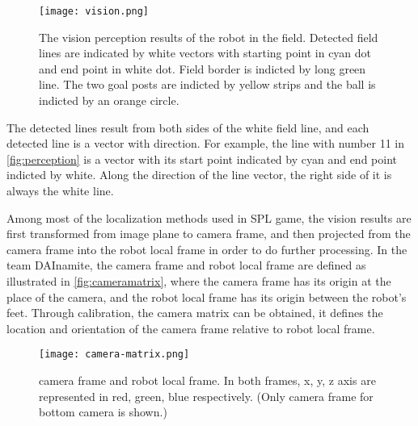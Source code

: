 \begin{figure}[h!]
  \centering
  \texttt{[image: vision.png]}
  \caption[The vision perception result of the robot in the field.]{The vision perception results of the robot in the field. Detected field lines are indicated by white vectors with starting point in cyan dot and end point in white dot. Field border is indicted by long green line. The two goal posts are indicted by yellow strips and the ball is indicted by an orange circle.}
  \label{fig:perception}
\end{figure}

The detected lines result from both sides of the white field line, and each detected line is a vector with direction. For example, the line with number 11 in \autoref{fig:perception} is a vector with its start point indicated by cyan and end point indicted by white. Along the direction of the line vector, the right side of it is always the white line.

Among most of the localization methods used in \gls{SPL} game, the vision results are first transformed from image plane to camera frame, and then projected from the camera frame into the robot local frame in order to do further processing. In the team DAInamite, the camera frame and robot local frame are defined as illustrated in \autoref{fig:cameramatrix}, where the camera frame has its origin at the place of the camera, and the robot local frame has its origin between the robot's feet. Through calibration, the camera matrix can be obtained, it defines the location and orientation of the camera frame relative to robot local frame.
\begin{figure}[h!]
  \centering
  \texttt{[image: camera-matrix.png]}
  \caption[Only camera frame for bottom camera is shown]{camera frame and robot local frame. In both frames, x, y, z axis are represented in red, green, blue respectively. (Only camera frame for bottom camera is shown.)}
  \label{fig:cameramatrix}
\end{figure}

